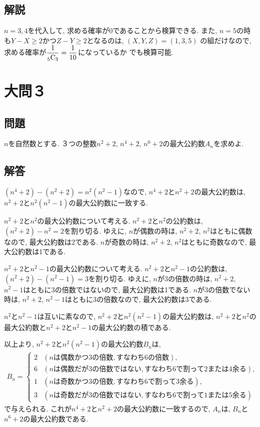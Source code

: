 \documentclass[dvipdfmx,a4paper]{jsarticle}
\begin{document}
    \subsection{解説}
    $n=3,4$を代入して, 求める確率が0であることから検算できる. 
    また, $n=5$の時も$Y-X \geq 2$かつ$Z-Y \geq 2$となるのは, $(X,Y,Z)=(1,3,5)$
    の組だけなので, 求める確率が$\dfrac{1}{{}_{5}\mathrm{C}_{3}}=\dfrac{1}{10}$になっているか
    でも検算可能. 


    \section{大問３}
    \subsection{問題}
    $n$を自然数とする. ３つの整数$n^2+2$, $n^4+2$, $n^6+2$の最大公約数$A_n$を求めよ. 

    \subsection{解答}
    $(n^4+2) - (n^2+2) = n^2(n^2-1)$なので, $n^4+2$と$n^2+2$の最大公約数は, 
    $n^2+2$と$n^2(n^2-1)$の最大公約数に一致する. 

    $n^2+2$と$n^2$の最大公約数について考える. 
    $n^2+2$と$n^2$の公約数は, $(n^2+2)-n^2=2$を割り切る. 
    ゆえに, $n$が偶数の時は, $n^2+2$, $n^2$はともに偶数なので, 最大公約数は2である. 
    $n$が奇数の時は, $n^2+2$, $n^2$はともに奇数なので, 最大公約数は1である. 

    $n^2+2$と$n^2-1$の最大公約数について考える. 
    $n^2+2$と$n^2-1$の公約数は, $(n^2+2)-(n^2-1)=3$を割り切る. 
    ゆえに, $n$が3の倍数の時は, $n^2+2$, $n^2-1$はともに3の倍数ではないので, 最大公約数は1である. 
    $n$が3の倍数でない時は, $n^2+2$, $n^2-1$はともに3の倍数なので, 最大公約数は3である. 

    $n^2$と$n^2-1$は互いに素なので, $n^2+2$と$n^2(n^2-1)$の最大公約数は, 
    $n^2+2$と$n^2$の最大公約数と$n^2+2$と$n^2-1$の最大公約数の積である. 

    以上より, $n^2+2$と$n^2(n^2-1)$の最大公約数$B_n$は, 
    \begin{eqnarray*}
        B_n = \left\{
            \begin{array}{lll}
                2 & (n\mathrm{は偶数かつ3の倍数, すなわち6の倍数}), \\
                6 & (n\mathrm{は偶数だが3の倍数ではない, すなわち6で割って2または4余る}), \\
                1 & (n\mathrm{は奇数かつ3の倍数, すなわち6で割って3余る}), \\
                3 & (n\mathrm{は奇数だが3の倍数ではない, すなわち6で割って1または5余る})
            \end{array}
        \right.
    \end{eqnarray*}
    で与えられる. これが$n^4+2$と$n^2+2$の最大公約数に一致するので, 
    $A_n$は, $B_n$と$n^6+2$の最大公約数である. 
    
\end{document}
